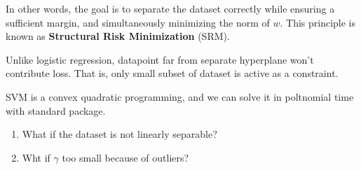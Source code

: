 \documentclass[../main]{subfiles}
\begin{document}
In other words, the goal is to separate the dataset correctly while ensuring a sufficient margin, and simultaneously minimizing the norm of $w$.  
This principle is known as \textbf{Structural Risk Minimization} (SRM).

\begin{remark}
    Unlike logistic regression, datapoint far from separate hyperplane won't contribute loss. That is, only small subset of dataset is active as a constraint.
\end{remark}
\begin{proposition}
    SVM is a convex quadratic programming, and we can solve it in poltnomial time with standard package.
\end{proposition}
\begin{problem}
\begin{enumerate}
    \item What if the dataset is not linearly separable?
    \item Wht if $\gamma$ too small because of outliers?
\end{enumerate}
\end{problem}
\end{document}
